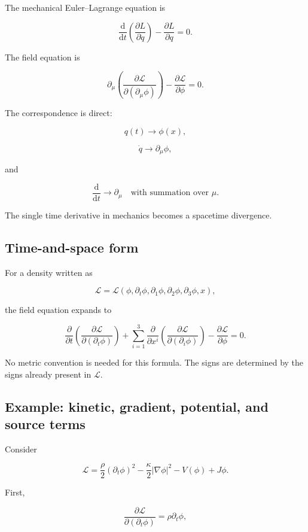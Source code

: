 The mechanical Euler--Lagrange equation is

\[
\frac{\mathrm{d}}{\mathrm{d}t}
\left(
\frac{\partial L}{\partial\dot q}
\right)
-
\frac{\partial L}{\partial q}
=0.
\]

The field equation is

\[
\partial_{\mu}
\left(
\frac{\partial\mathcal{L}}
{\partial(\partial_{\mu}\phi)}
\right)
-
\frac{\partial\mathcal{L}}{\partial\phi}
=0.
\]

The correspondence is direct:

\[
q(t)
\longrightarrow
\phi(x),
\]

\[
\dot q
\longrightarrow
\partial_{\mu}\phi,
\]

and

\[
\frac{\mathrm{d}}{\mathrm{d}t}
\longrightarrow
\partial_{\mu}
\quad\text{with summation over }\mu.
\]

The single time derivative in mechanics becomes a spacetime divergence.

\subsection{Time-and-space form}

For a density written as

\[
\mathcal{L}
=
\mathcal{L}(
\phi,
\partial_{t}\phi,
\partial_{1}\phi,
\partial_{2}\phi,
\partial_{3}\phi,
x),
\]

the field equation expands to

\[
\boxed{
\frac{\partial}{\partial t}
\left(
\frac{\partial\mathcal{L}}
{\partial(\partial_{t}\phi)}
\right)
+
\sum_{i=1}^{3}
\frac{\partial}{\partial x^{i}}
\left(
\frac{\partial\mathcal{L}}
{\partial(\partial_{i}\phi)}
\right)
-
\frac{\partial\mathcal{L}}{\partial\phi}
=0
}.
\]

No metric convention is needed for this formula. The signs are determined by the signs already present in \(\mathcal{L}\).

\subsection{Example: kinetic, gradient, potential, and source terms}

Consider

\[
\mathcal{L}
=
\frac{\rho}{2}(\partial_{t}\phi)^{2}
-
\frac{\kappa}{2}|\nabla\phi|^{2}
-
V(\phi)
+
J\phi.
\]

First,

\[
\frac{\partial\mathcal{L}}
{\partial(\partial_{t}\phi)}
=
\rho\partial_{t}\phi,
\]

